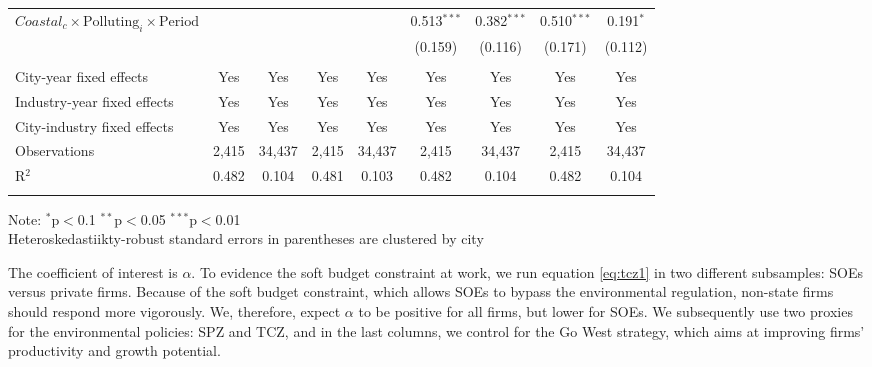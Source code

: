 \documentclass[12pt]{article}
\begin{document}
\begin{sidewaystable}
\begin{adjustbox}{width=\textwidth, totalheight=\baselineskip,keepaspectratio}
\begin{tabular}{@{\extracolsep{5pt}}lcccccccc}
      $Coastal_c \times \text{Polluting}_i \times \text{Period}$ &              &               &               &               & 0.513$^{***}$ & 0.382$^{***}$ & 0.510$^{***}$ & 0.191$^{*}$   \\
                                                              &              &               &               &               & (0.159)       & (0.116)       & (0.171)       & (0.112)       \\
      \hline \\[-1.8ex]
      City-year fixed effects                                 & Yes          & Yes           & Yes           & Yes           & Yes           & Yes           & Yes           & Yes           \\
      Industry-year fixed effects                             & Yes          & Yes           & Yes           & Yes           & Yes           & Yes           & Yes           & Yes           \\
      City-industry fixed effects                             & Yes          & Yes           & Yes           & Yes           & Yes           & Yes           & Yes           & Yes           \\
      Observations                                            & 2,415        & 34,437        & 2,415         & 34,437        & 2,415         & 34,437        & 2,415         & 34,437        \\
      R$^{2}$                                                 & 0.482        & 0.104         & 0.481         & 0.103         & 0.482         & 0.104         & 0.482         & 0.104         \\
      \hline
      \hline \\[-1.8ex]
      \end{tabular}
  \end{adjustbox}
  \begin{tablenotes}
      \small
      \item 
      Note: $^{*}$p$<$0.1 $^{**}$p$<$0.05 $^{***}$p$<$0.01 \\
      Heteroskedastiikty-robust standard errors in parentheses are clustered by city \\
    \end{tablenotes}
\end{sidewaystable}

The coefficient of interest is $\alpha$. To evidence the soft budget constraint at work, we run equation \ref{eq:tcz1} in two different subsamples: SOEs versus private firms. Because of the soft budget constraint, which allows SOEs to bypass the environmental regulation, non-state firms should respond more vigorously. We, therefore, expect $\alpha$ to be positive for all firms, but lower for SOEs. We subsequently use two proxies for the environmental policies: SPZ and TCZ, and in the last columns, we control for the Go West strategy, which aims at improving firms' productivity and growth potential.
\end{document}
